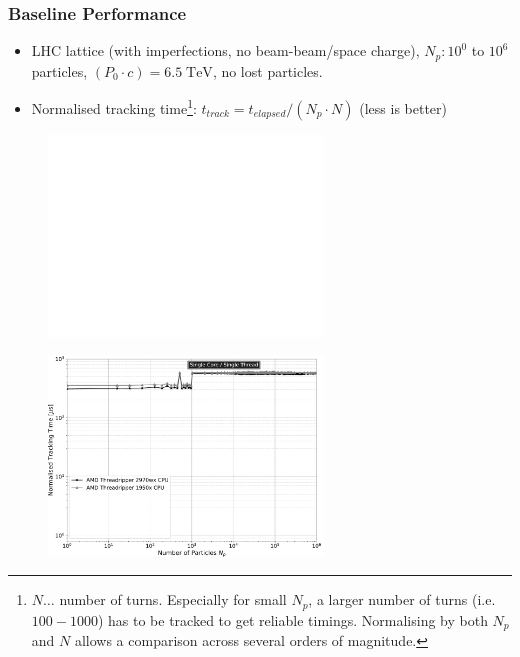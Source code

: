 \documentclass{beamer}
\begin{document}
\begin{frame}
    \frametitle{Baseline Performance}
    \begin{itemize}
        \item<1->LHC lattice (with imperfections, no beam-beam/space charge), $N_p: 10^0$ to $10^6$ particles, $(P_0 \cdot c) = 6.5\;\text{TeV}$, no lost particles.
        \item<2->{\color{MyDarkBlue}Normalised tracking time\footnote{$N \ldots$ number of turns. Especially for small
                  $N_p$, a larger number of turns (i.e. $100 - 1000$) has to be tracked to get reliable timings.
                  Normalising by both $N_p$ and $N$ allows a comparison across several orders of magnitude.}:} $t_{track} = t_{elapsed}/\left( N_p \cdot N \right)$ (less is better)
    \end{itemize}
    {
        \begin{figure}[H]
            \centering
            \includegraphics[width=0.65\textwidth]{presentation_images/baseline_benchmark_overview_00}
        \end{figure}
    }
    {
        \begin{figure}[H]
            \centering
            \includegraphics[width=0.65\textwidth]{presentation_images/baseline_benchmark_overview_01}
        \end{figure}
}
\end{frame}
\end{document}
